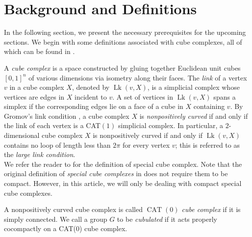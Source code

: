 \documentclass[oneside,11pt,reqno]{amsart}
\theoremstyle{definition}
\DeclareMathOperator{\Lk}{Lk}
\DeclareMathOperator{\CAT}{CAT}
\begin{document}
\section{Background and Definitions}



In the following section, we present the necessary prerequisites for the upcoming sections. We begin with some definitions associated with cube complexes, all of which can be found in \cite{bridh}.


A \textit{cube complex} is a space constructed by gluing together Euclidean unit cubes $[0,1]^n$ of various dimensions via isometry along their faces. The \textit{link} of a vertex $v$ in a cube complex $X$, denoted by $\Lk(v, X)$, is a simplicial complex whose vertices are edges in $X$ incident to $v$. A set of vertices in $\Lk(v, X)$ spans a simplex if the corresponding edges lie on a face of a cube in $X$ containing $v$. By Gromov's link condition \cite{bridh}, a cube complex $X$ is \textit{nonpositively curved} if and only if the link of each vertex is a CAT$(1)$ simplicial complex. In particular, a  $2$-dimensional cube complex $X$ is nonpositively curved if and only if $\Lk(v, X)$ contains no loop of length less than $2\pi$ for every vertex $v$; this is referred to as the \textit{large link condition}.  
\\We refer the reader to \cite{spcl}  for the definition of special cube complex. Note that the original definition of \emph{special cube complexes} in \cite{spcl} does not require them to be compact. However, in this article, we will only be dealing with compact special cube complexes.

A nonpositively curved cube complex is called \textit{$\CAT(0)$ cube complex } if it is simply connected. We call a group $G$ to be \emph{cubulated} if it acts properly cocompactly on a CAT($0$)
 cube complex.

\end{document}
